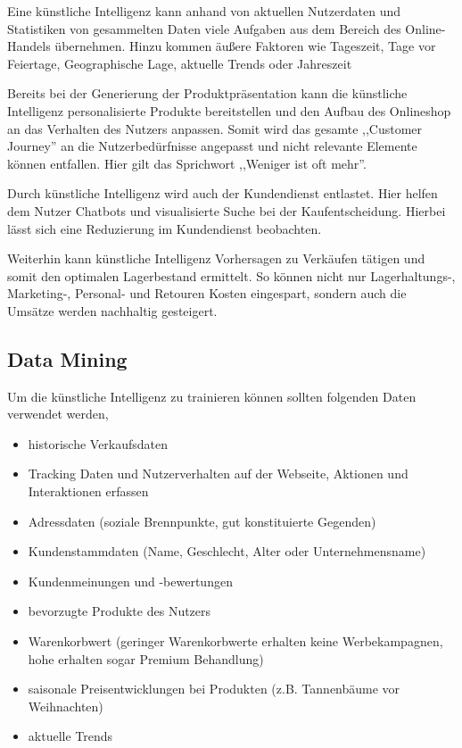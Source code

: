Eine künstliche Intelligenz kann anhand von aktuellen Nutzerdaten und Statistiken von gesammelten Daten viele Aufgaben aus dem Bereich des Online-Handels übernehmen. Hinzu kommen äußere Faktoren wie Tageszeit, Tage vor Feiertage, Geographische Lage, aktuelle Trends oder Jahreszeit\vspace{0.2cm}

Bereits bei der Generierung der Produktpräsentation kann die künstliche Intelligenz personalisierte Produkte  bereitstellen und den Aufbau des Onlineshop an das Verhalten des Nutzers anpassen. Somit wird das gesamte ,,Customer Journey'' an die Nutzerbedürfnisse angepasst und nicht relevante Elemente können entfallen. Hier gilt das Sprichwort ,,Weniger ist oft mehr''.\vspace{0.2cm}

Durch künstliche Intelligenz wird auch der Kundendienst entlastet. Hier helfen dem Nutzer Chatbots und visualisierte Suche bei der Kaufentscheidung. Hierbei lässt sich eine Reduzierung im Kundendienst beobachten.\vspace{0.2cm}

Weiterhin kann künstliche Intelligenz Vorhersagen zu Verkäufen tätigen und somit den optimalen Lagerbestand ermittelt. So können nicht nur Lagerhaltungs-, Marketing-, Personal- und Retouren Kosten eingespart, sondern auch die Umsätze werden nachhaltig gesteigert.

\subsection{Data Mining}
Um die künstliche Intelligenz zu trainieren können sollten folgenden Daten verwendet werden,

\begin{itemize}
	\item historische Verkaufsdaten
	\item Tracking Daten und Nutzerverhalten auf der Webseite, Aktionen und Interaktionen erfassen
	\item Adressdaten (soziale Brennpunkte, gut konstituierte Gegenden)
	\item Kundenstammdaten (Name, Geschlecht, Alter oder Unternehmensname)
	\item Kundenmeinungen und -bewertungen
	\item bevorzugte Produkte des Nutzers
	\item Warenkorbwert (geringer Warenkorbwerte erhalten keine Werbekampagnen, hohe erhalten sogar Premium Behandlung)
	\item saisonale Preisentwicklungen bei Produkten (z.B. Tannenbäume vor Weihnachten)
	\item aktuelle Trends
\end{itemize}

